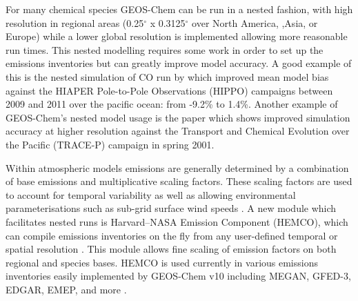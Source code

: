 For many chemical species GEOS-Chem can be run in a nested fashion, with high resolution in regional areas (0.25$^{\circ}$ x 0.3125$^{\circ}$ over North America, ,Asia, or Europe) while a lower global resolution is implemented allowing more reasonable run times.
This nested modelling requires some work in order to set up the emissions inventories but can greatly improve model accuracy.
A good example of this is the nested simulation of CO run by \citet{Yan_2014} which improved mean model bias against the HIAPER Pole-to-Pole Observations (HIPPO) campaigns between 2009 and 2011 over the pacific ocean: from -9.2\% to 1.4\%.
Another example of GEOS-Chem's nested model usage is the \citet{Wang_2004} paper which shows improved simulation accuracy at higher resolution against the Transport and Chemical Evolution over the Pacific (TRACE-P) campaign in spring 2001. 

Within atmospheric models emissions are generally determined by a combination of base emissions and multiplicative scaling factors. 
These scaling factors are used to account for temporal variability as well as allowing environmental parameterisations such as sub-grid surface wind speeds \cite{Ridley_2013,Zender_2003}.
A new module which facilitates nested runs is Harvard–NASA Emission Component (HEMCO), which can compile emissions inventories on the fly from any user-defined temporal or spatial resolution \cite{Keller_2014}.
This module allows fine scaling of emission factors on both regional and species bases.
HEMCO is used currently in various emissions inventories easily implemented by GEOS-Chem v10 including MEGAN, GFED-3, EDGAR, EMEP, and more \cite{Keller_2014}.